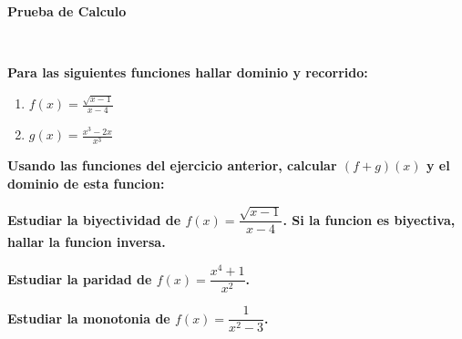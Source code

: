\documentclass[answers]{exam}
\begin{document}
\begin{center}
	\large\textbf{Prueba de Calculo}\\[1em]
\end{center}




	\\



\vspace{0.5cm}

\begin{questions}

	
	\question \large\textbf{Para las siguientes funciones hallar dominio y recorrido:}
	\begin{enumerate}[label=\alph*.]
		\item $\displaystyle f(x) = \frac{\sqrt{x-1}}{x-4} $
		\item $\displaystyle g(x) = \frac{x^3-2x}{x^3} $
	\end{enumerate}
	
	\vspace{0.5cm}
	\question \large\textbf{Usando las funciones del ejercicio anterior, calcular $(f+g)(x)$ y el dominio de esta funcion:}

	\vspace{0.5cm}
	\question \large\textbf{Estudiar la biyectividad de $f(x)=\dfrac{\sqrt{x-1}}{x-4}$. Si la funcion es biyectiva, hallar la funcion inversa.}

	\vspace{0.5cm}
	\question \large\textbf{Estudiar la paridad de $f(x)=\dfrac{x^4+1}{x^2}$.}

	\vspace{0.5cm}
	\question \large\textbf{Estudiar la monotonia de $f(x)= \dfrac{1}{x^2-3}$.}

	\vspace{0.5cm}

	
\end{questions}
\end{document}
